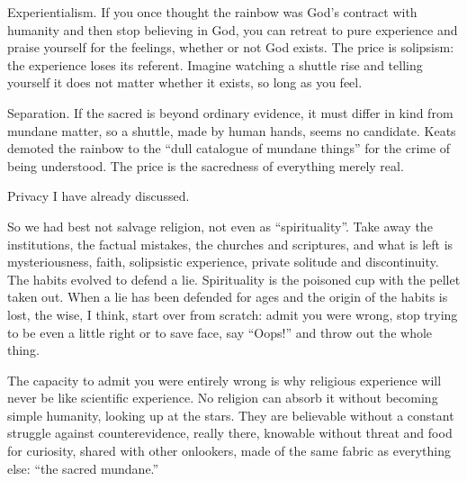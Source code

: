 Experientialism. If you once thought the rainbow was God's contract with humanity and then stop believing in God, you can retreat to pure experience and praise yourself for the feelings, whether or not God exists. The price is solipsism: the experience loses its referent. Imagine watching a shuttle rise and telling yourself it does not matter whether it exists, so long as you feel.

Separation. If the sacred is beyond ordinary evidence, it must differ in kind from mundane matter, so a shuttle, made by human hands, seems no candidate. Keats demoted the rainbow to the ``dull catalogue of mundane things'' for the crime of being understood.  The price is the sacredness of everything merely real.

Privacy I have already discussed.

So we had best not salvage religion, not even as ``spirituality''. Take away the institutions, the factual mistakes, the churches and scriptures, and what is left is mysteriousness, faith, solipsistic experience, private solitude and discontinuity.  The habits evolved to defend a lie. Spirituality is the poisoned cup with the pellet taken out. When a lie has been defended for ages and the origin of the habits is lost, the wise, I think, start over from scratch: admit you were wrong, stop trying to be even a little right or to save face, say ``Oops!'' and throw out the whole thing. 

The capacity to admit you were entirely wrong is why religious experience will never be like scientific experience. No religion can absorb it without becoming simple humanity, looking up at the stars. They are believable without a constant struggle against counterevidence, really there, knowable without threat and food for curiosity, shared with other onlookers, made of the same fabric as everything else: ``the sacred mundane.''
